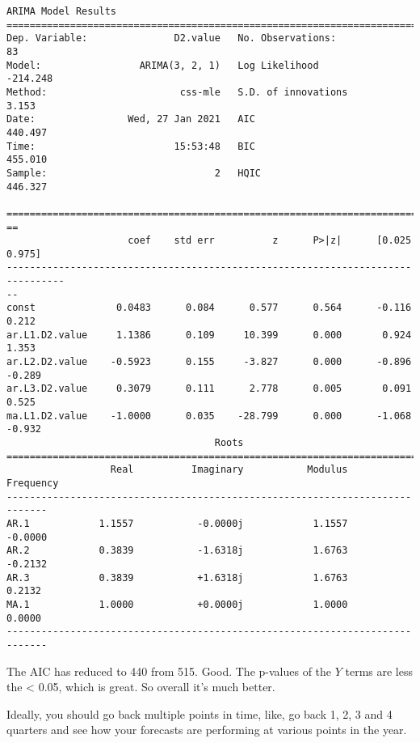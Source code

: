 \begin{tcolorbox}[breakable, size=fbox, boxrule=1pt, pad at break*=1mm,colback=cellbackground, colframe=cellborder]
\begin{Verbatim}[commandchars=\\\{\}]
                             ARIMA Model Results
==============================================================================
Dep. Variable:               D2.value   No. Observations:                   83
Model:                 ARIMA(3, 2, 1)   Log Likelihood                -214.248
Method:                       css-mle   S.D. of innovations              3.153
Date:                Wed, 27 Jan 2021   AIC                            440.497
Time:                        15:53:48   BIC                            455.010
Sample:                             2   HQIC                           446.327

================================================================================
==
                     coef    std err          z      P>|z|      [0.025
0.975]
--------------------------------------------------------------------------------
--
const              0.0483      0.084      0.577      0.564      -0.116
0.212
ar.L1.D2.value     1.1386      0.109     10.399      0.000       0.924
1.353
ar.L2.D2.value    -0.5923      0.155     -3.827      0.000      -0.896
-0.289
ar.L3.D2.value     0.3079      0.111      2.778      0.005       0.091
0.525
ma.L1.D2.value    -1.0000      0.035    -28.799      0.000      -1.068
-0.932
                                    Roots
=============================================================================
                  Real          Imaginary           Modulus         Frequency
-----------------------------------------------------------------------------
AR.1            1.1557           -0.0000j            1.1557           -0.0000
AR.2            0.3839           -1.6318j            1.6763           -0.2132
AR.3            0.3839           +1.6318j            1.6763            0.2132
MA.1            1.0000           +0.0000j            1.0000            0.0000
-----------------------------------------------------------------------------
\end{Verbatim}
\end{tcolorbox}

\begin{center}
\end{center}
    
The AIC has reduced to 440 from 515. Good. The p-values of the \(Y\)
terms are less the \textless{} 0.05, which is great. So overall it's
much better.

Ideally, you should go back multiple points in time, like, go back 1, 2,
3 and 4 quarters and see how your forecasts are performing at various
points in the year.

